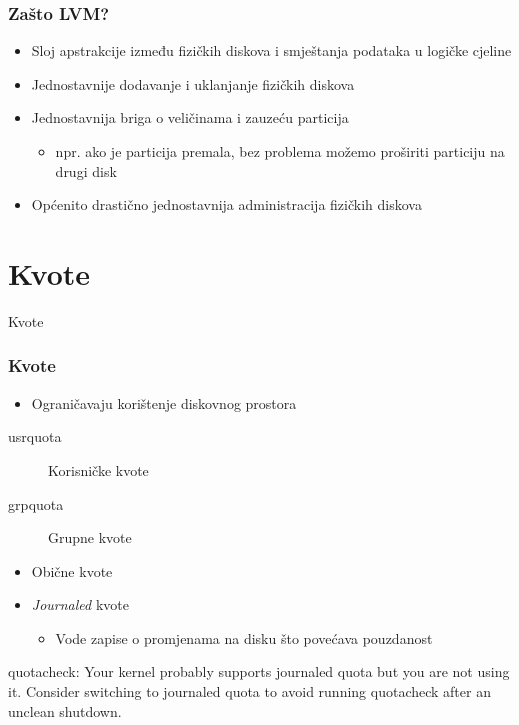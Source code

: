 \documentclass[t]{beamer}
\begin{document}
\begin{frame}[fragile]
	\frametitle{Zašto LVM?}
	\begin{itemize}
		\item Sloj apstrakcije između fizičkih diskova i smještanja podataka u logičke cjeline
		\item Jednostavnije dodavanje i uklanjanje fizičkih diskova
		\item Jednostavnija briga o veličinama i zauzeću particija
		\begin{itemize}
			\item npr. ako je particija premala, bez problema možemo proširiti particiju na drugi disk
		\end{itemize}
		\item Općenito drastično jednostavnija administracija fizičkih diskova
	\end{itemize}
\end{frame}



\section{Kvote}

\begin{frame}
	\vspace*{\fill}
		\begin{center}
			\Huge{Kvote}
		\end{center}
	\vspace*{\fill}
\end{frame}

\begin{frame}
	\frametitle{Kvote}
	\begin{itemize}
		\item Ograničavaju korištenje diskovnog prostora
	\end{itemize}
	\begin{description}
		\item[usrquota] Korisničke kvote
		\item[grpquota] Grupne kvote
	\end{description}
	\begin{itemize}
		\item Obične kvote
		\item \emph{Journaled} kvote
		\begin{itemize}
			\item Vode zapise o promjenama na disku što povećava pouzdanost
		\end{itemize}
	\end{itemize}
	\vspace{1em}
	{\ttfamily \small
		quotacheck: Your kernel probably supports journaled quota but you are not using it.
		Consider switching to journaled quota to avoid running quotacheck after an unclean
		shutdown.
	}
\end{frame}
\end{document}

